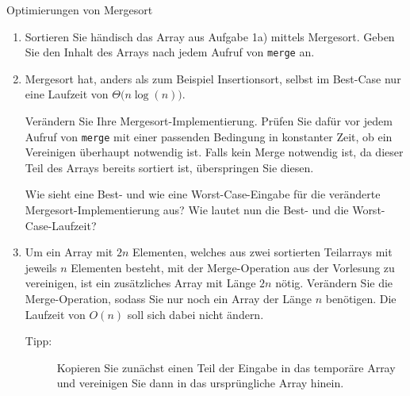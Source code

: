 \documentclass[11pt,a4paper]{article}
\begin{document}
\begin{aufgabe}{2}{Optimierungen von Mergesort}
    \begin{enumerate}
        \item Sortieren Sie händisch das Array aus Aufgabe 1a) mittels Mergesort.
        Geben Sie den Inhalt des Arrays nach jedem Aufruf von \texttt{merge} an.
        \item Mergesort hat, anders als zum Beispiel Insertionsort, selbst im Best-Case nur eine Laufzeit von $\Theta\big(n \log(n)\big)$.

        Verändern Sie Ihre Mergesort-Implementierung.
        Prüfen Sie dafür vor jedem Aufruf von \texttt{merge} mit einer passenden Bedingung in konstanter Zeit, ob ein Vereinigen überhaupt notwendig ist.
        Falls kein Merge notwendig ist, da dieser Teil des Arrays bereits sortiert ist, überspringen Sie diesen.

        Wie sieht eine Best- und wie eine Worst-Case-Eingabe für die veränderte Mergesort-Implementierung aus?
        Wie lautet nun die Best- und die Worst-Case-Laufzeit?
        \item Um ein Array mit $2n$ Elementen, welches aus zwei sortierten Teilarrays mit jeweils $n$ Elementen besteht, mit der Merge-Operation aus der Vorlesung zu vereinigen, ist ein zusätzliches Array mit Länge $2n$ nötig.
        Verändern Sie die Merge-Operation, sodass Sie nur noch ein Array der Länge $n$ benötigen. Die Laufzeit von $O(n)$ soll sich dabei nicht ändern.
        \begin{description}
            \item[Tipp:] Kopieren Sie zunächst einen Teil der Eingabe in das temporäre Array und vereinigen Sie dann in das ursprüngliche Array hinein.
        \end{description}
    \end{enumerate}
    
\end{aufgabe}
\end{document}

